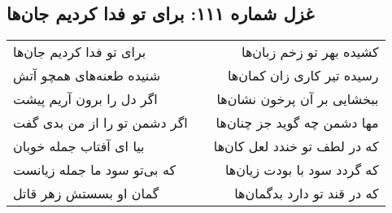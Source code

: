 \begin{center}
\section*{غزل شماره ۱۱۱: برای تو فدا کردیم جان‌ها}
\label{sec:0111}
\begin{longtable}{l p{0.5cm} r}
برای تو فدا کردیم جان‌ها
&&
کشیده بهر تو زخم زبان‌ها
\\
شنیده طعنه‌های همچو آتش
&&
رسیده تیر کاری زان کمان‌ها
\\
اگر دل را برون آریم پیشت
&&
ببخشایی بر آن پرخون نشان‌ها
\\
اگر دشمن تو را از من بدی گفت
&&
مها دشمن چه گوید جز چنان‌ها
\\
بیا ای آفتاب جمله خوبان
&&
که در لطف تو خندد لعل کان‌ها
\\
که بی‌تو سود ما جمله زیانست
&&
که گردد سود با بودت زیان‌ها
\\
گمان او بسستش زهر قاتل
&&
که در قند تو دارد بدگمان‌ها
\\
\end{longtable}
\end{center}
